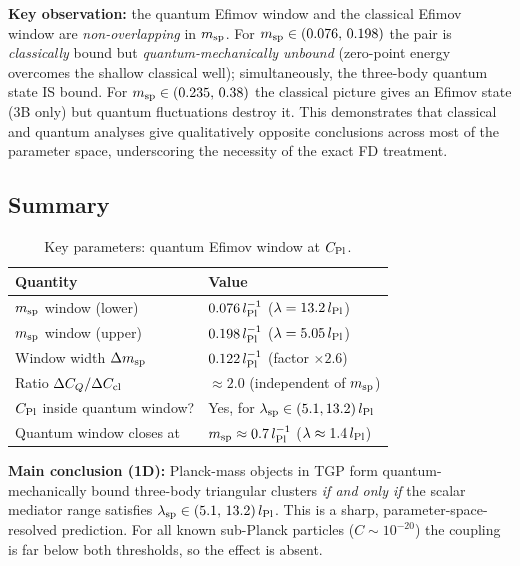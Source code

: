 \noindent
\textbf{Key observation:} the quantum Efimov window and the classical
Efimov window are \emph{non-overlapping} in $m_{\rm sp}$.  For
$m_{\rm sp}\in(0.076,\,0.198)$ the pair is \emph{classically} bound
but \emph{quantum-mechanically unbound} (zero-point energy overcomes the
shallow classical well); simultaneously, the three-body quantum state
IS bound.  For $m_{\rm sp}\in(0.235,\,0.38)$ the classical picture
gives an Efimov state (3B only) but quantum fluctuations destroy it.
This demonstrates that classical and quantum analyses give qualitatively
opposite conclusions across most of the parameter space, underscoring the
necessity of the exact FD treatment.

\subsection{Summary}

\begin{table}[h]
\centering
\caption{Key parameters: quantum Efimov window at $C_{\rm Pl}$.}
\label{tab:qm_window_msp_summary}
\begin{tabular}{ll}
\hline
Quantity & Value \\
\hline
$m_{\rm sp}$ window (lower) & $0.076\,l_{\rm Pl}^{-1}$
  ($\lambda=13.2\,l_{\rm Pl}$) \\
$m_{\rm sp}$ window (upper) & $0.198\,l_{\rm Pl}^{-1}$
  ($\lambda=5.05\,l_{\rm Pl}$) \\
Window width $\Delta m_{\rm sp}$ & $0.122\,l_{\rm Pl}^{-1}$ (factor $\times2.6$) \\
Ratio $\Delta C_Q / \Delta C_{\rm cl}$ & $\approx 2.0$ (independent of $m_{\rm sp}$) \\
$C_{\rm Pl}$ inside quantum window? & Yes, for $\lambda_{\rm sp}\in(5.1,13.2)\,l_{\rm Pl}$ \\
Quantum window closes at & $m_{\rm sp}\approx0.7\,l_{\rm Pl}^{-1}$
  ($\lambda\approx1.4\,l_{\rm Pl}$) \\
\hline
\end{tabular}
\end{table}

\noindent
\textbf{Main conclusion (1D):} Planck-mass objects in TGP form
quantum-mechanically bound three-body triangular clusters \emph{if and
only if} the scalar mediator range satisfies
$\lambda_{\rm sp}\in(5.1,\,13.2)\,l_{\rm Pl}$.  This is a sharp,
parameter-space-resolved prediction.  For all known sub-Planck particles
($C\sim10^{-20}$) the coupling is far below both thresholds, so the
effect is absent.

